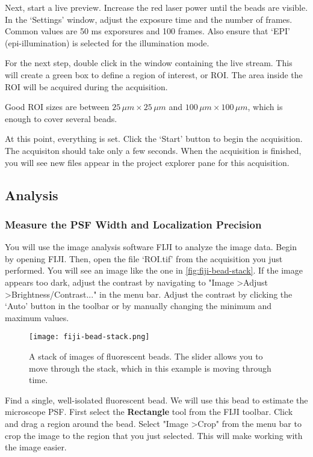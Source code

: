 \documentclass[10pt,a4paper,oneside]{book}
\begin{document}
Next, start a live preview. Increase the red laser power until the beads are visible. In the `Settings' window, adjust the exposure time and the number of frames. Common values are 50 ms exporsures and 100 frames. Also ensure that `EPI' (epi-illumination) is selected for the illumination mode.

For the next step, double click in the window containing the live stream. This will create a green box to define a region of interest, or ROI. The area inside the ROI will be acquired during the acquisition.

Good ROI sizes are between $25 \, \mu m\times 25 \, \mu m$ and $100 \, \mu m\times 100 \, \mu m$, which is enough to cover several beads.

At this point, everything is set. Click the `Start' button to begin the acquisition. The acquisiton should take only a few seconds. When the acquisition is finished, you will see new files appear in the project explorer pane for this acquisition.

\subsection{Analysis}

\subsubsection{Measure the PSF Width and Localization Precision}

You will use the image analysis software FIJI to analyze the image data. Begin by opening FIJI. Then, open the file `ROI.tif' from the acquisition you just performed. You will see an image like the one in \autoref{fig:fiji-bead-stack}. If the image appears too dark, adjust the contrast by navigating to "Image \textgreater Adjust \textgreater Brightness/Contrast..." in the menu bar. Adjust the contrast by clicking the `Auto' button in the toolbar or by manually changing the minimum and maximum values.

\begin{figure}[ht]
    \centering
    \texttt{[image: fiji-bead-stack.png]}
    \caption{A stack of images of fluorescent beads. The slider allows you to move through the stack, which in this example is moving through time.}
    \label{fig:fiji-bead-stack}
\end{figure}

Find a single, well-isolated fluorescent bead. We will use this bead to estimate the microscope PSF. First select the \textbf{Rectangle} tool from the FIJI toolbar. Click and drag a region around the bead. Select "Image \textgreater Crop" from the menu bar to crop the image to the region that you just selected. This will make working with the image easier.
\end{document}
